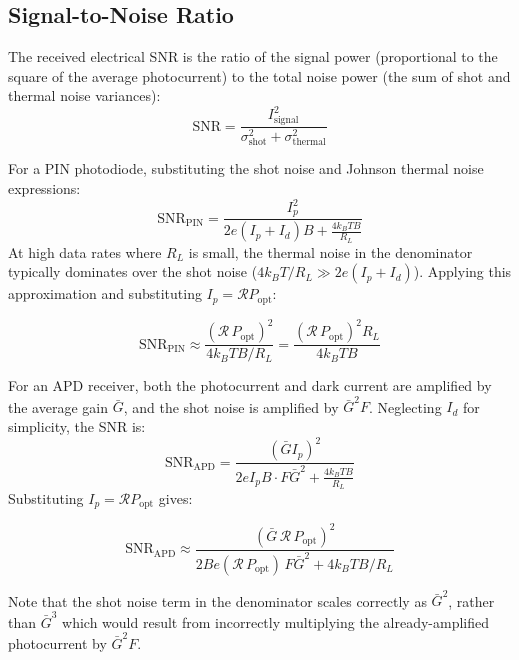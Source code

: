 \subsection{Signal-to-Noise Ratio}

The received electrical SNR is the ratio of the signal power (proportional to the square of the average photocurrent) to the total noise power (the sum of shot and thermal noise variances):
\begin{equation*}
    \text{SNR} = \frac{I_\text{signal}^2}{\sigma_\text{shot}^2 + \sigma_\text{thermal}^2}
\end{equation*}

For a PIN photodiode, substituting the shot noise and Johnson thermal noise expressions:
\begin{equation*}
    \text{SNR}_\text{PIN} = \frac{I_p^2}{2e(I_p + I_d)B + \frac{4k_B T B}{R_L}}
\end{equation*}
At high data rates where $R_L$ is small, the thermal noise in the denominator typically dominates over the shot noise ($4k_B T/R_L \gg 2e(I_p + I_d)$). Applying this approximation and substituting $I_p = \mathcal{R} P_\text{opt}$:
\begin{keyresult}
    \begin{equation}
        \text{SNR}_\text{PIN} \approx \frac{(\mathcal{R}\,P_\text{opt})^2}{4k_BT B/R_L} = \frac{(\mathcal{R}\,P_\text{opt})^2 R_L}{4k_BT B}
    \end{equation}
\end{keyresult}

For an APD receiver, both the photocurrent and dark current are amplified by the average gain $\bar{G}$, and the shot noise is amplified by $\bar{G}^2 F$. Neglecting $I_d$ for simplicity, the SNR is:
\begin{equation*}
    \text{SNR}_\text{APD} = \frac{(\bar{G} I_p)^2}{2e I_p B \cdot F\bar{G}^2 + \frac{4k_B T B}{R_L}}
\end{equation*}
Substituting $I_p = \mathcal{R} P_\text{opt}$ gives:
\begin{keyresult}
    \begin{equation}
        \text{SNR}_\text{APD} \approx \frac{(\bar{G}\,\mathcal{R}\,P_\text{opt})^2}{2Be(\mathcal{R}\,P_\text{opt})\,F\bar{G}^2 + 4k_BTB/R_L}
    \end{equation}
\end{keyresult}
Note that the shot noise term in the denominator scales correctly as $\bar{G}^2$, rather than $\bar{G}^3$ which would result from incorrectly multiplying the already-amplified photocurrent by $\bar{G}^2 F$.

